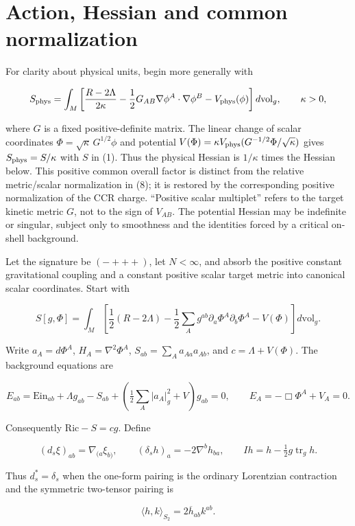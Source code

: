 \section{Action, Hessian and common normalization}

For clarity about physical units, begin more generally with

\[
 S_{\rm phys}=\int_M\left[\frac{R-2\Lambda}{2\kappa}
 -\frac12 G_{AB}\nabla\phi^A\cdot\nabla\phi^B-V_{\rm phys}(\phi)\right]d\mathrm{vol}_g,
 \qquad \kappa>0,
\]

where $G$ is a fixed positive-definite matrix. The linear change of scalar coordinates $\Phi=\sqrt\kappa\,G^{1/2}\phi$ and potential $V(\Phi)=\kappa V_{\rm phys}(G^{-1/2}\Phi/\sqrt\kappa)$ gives $S_{\rm phys}=S/\kappa$ with $S$ in (1). Thus the physical Hessian is $1/\kappa$ times the Hessian below. This positive common overall factor is distinct from the relative metric/scalar normalization in (8); it is restored by the corresponding positive normalization of the CCR charge. ``Positive scalar multiplet'' refers to the target kinetic metric $G$, not to the sign of $V_{AB}$. The potential Hessian may be indefinite or singular, subject only to smoothness and the identities forced by a critical on-shell background.

Let the signature be $(-+++)$, let $N<\infty$, and absorb the positive constant gravitational coupling and a constant positive scalar target metric into canonical scalar coordinates. Start with

\[
 S[g,\Phi]=\int_M\left[\frac12(R-2\Lambda)
 -\frac12\sum_A g^{ab}\partial_a\Phi^A\partial_b\Phi^A-V(\Phi)\right]d\mathrm{vol}_g.
 \tag{1}
\]

Write $a_A=d\Phi^A$, $H_A=\nabla^2\Phi^A$, $S_{ab}=\sum_Aa_{Aa}a_{Ab}$, and $c=\Lambda+V(\Phi)$. The background equations are

\[
 E_{ab}=\mathrm{Ein}_{ab}+\Lambda g_{ab}
 -S_{ab}+\left(\tfrac12\sum_A|a_A|_g^2+V\right)g_{ab}=0,
 \qquad E_A=-\Box\Phi^A+V_A=0.
 \tag{2}
\]

Consequently $\mathrm{Ric}-S=cg$. Define

\[
 (d_s\xi)_{ab}=\nabla_{(a}\xi_{b)},\qquad
 (\delta_s h)_a=-2\nabla^b h_{ba},\qquad
 Ih=h-\tfrac12g\operatorname{tr}_g h.
 \tag{3}
\]

Thus $d_s^*=\delta_s$ when the one-form pairing is the ordinary Lorentzian contraction and the symmetric two-tensor pairing is

\[
 \langle h,k\rangle_{S_2}=2\overline h_{ab}k^{ab}.
 \tag{4}
\]

